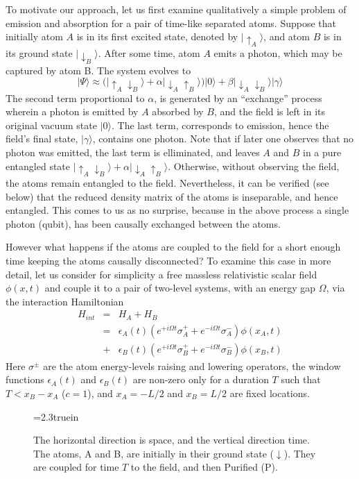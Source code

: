 \documentclass[12pt]{article}
\newcommand{\beq}{\begin{equation}}
\newcommand{\eeq}{\end{equation}}
\newcommand{\beqa}{\begin{eqnarray}}
\newcommand{\eeqa}{\end{eqnarray}}
\def \ra {\rangle}
\def \up {\uparrow}
\def \down {\downarrow}
\begin{document}
To motivate our approach, let us first examine qualitatively
a simple problem of emission and absorption
for a pair of time-like separated atoms.
Suppose that initially atom $A$ is in its first excited state,
denoted
by $|\up_A\ra$, and atom $B$ is in its ground state
$|\down_B\ra$. After some time, atom $A$ emits a photon,
which may be captured by atom B. The system evolves to
\beq
|\Psi\ra \approx
\biggl(|\up_A\down_B\ra + \alpha |\down_A\up_B\ra\biggr)|0\ra
+ \beta |\down_A\down_B\ra|\gamma\ra
\eeq
The second term proportional to $\alpha$, is generated by an
``exchange'' process wherein a photon is emitted by
$A$ absorbed by $B$, and the
field is left in its original vacuum state $|0\ra$.
The last term,  corresponds to emission,  hence
the field's final  state,  $|\gamma\ra$, contains one photon.
Note that if later one observes that no photon was emitted,
the last term is elliminated, and leaves $A$ and $B$
in a pure entangled state
$|\up_A\down_B\ra + \alpha |\down_A\up_B\ra$.
Otherwise, without  observing the field, the
atoms remain entangled to the field.
Nevertheless, it can be verified (see below)
that the reduced density matrix of the atoms is inseparable,
and hence entangled.
This comes to us as no surprise, because in the above process
a single photon (qubit),
has been causally exchanged between the atoms.

However what happens if the atoms are coupled to the field for a short
enough time  keeping the atoms causally disconnected?
To examine this case in more detail, let us consider for
simplicity a free massless relativistic scalar field $\phi(x,t)$ and
couple it to a pair of two-level systems,
with an energy gap $\Omega$,
via the interaction Hamiltonian
\beqa
H_{int} &=& H_A + H_B \nonumber \\
&=&\epsilon_A(t)(e^{+i\Omega t}\sigma_A^+ +e^{-i\Omega t}
\sigma_A^-)\phi(x_A,t)
\nonumber \\
&+& \epsilon_B(t)(e^{+i\Omega t}\sigma_B^+
+ e^{-i\Omega t} \sigma^-_B)\phi(x_B,t)
\eeqa
Here $\sigma^\pm$ are the atom energy-levels raising and lowering operators,
the window functions $\epsilon_A(t)$ and $\epsilon_B(t)$
are non-zero only for a duration
$T$ such that $T < x_B-x_A$ ($c=1$), and
$x_A=-L/2$ and $x_B=L/2$
are fixed locations.

\begin{figure} \epsfxsize=2.3truein
      \centerline{}
\vspace {0.5cm}
  \caption[]{ The horizontal direction is
space, and the vertical direction time.
The atoms, A and B, are initially in their ground state ($\down$).
They are coupled for time $T$ to the  field,
and then Purified (P).}
    \label{purify} \end{figure}
\end{document}
